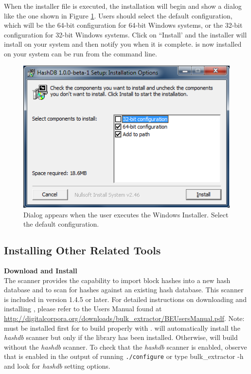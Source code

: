 \documentclass[11pt,fleqn]{article} %
\begin{document}
When the installer file is executed, the installation will begin and show a dialog like the one shown in Figure \ref{fig:windowsInstaller}.  Users should select the default configuration, which will be the 64-bit configuration for 64-bit Windows systems, or the 32-bit configuration for 32-bit Windows systems. Click on ``Install' and the installer will install \hash on your system and then notify you when it is complete. \hash is now installed on your system can be run from the command line.\\

\begin{figure}
	\center
	\includegraphics[scale=.8]{WindowsInstaller.png}
	\caption{Dialog appears when the user executes the Windows Installer. Select the default configuration.}
	\label{fig:windowsInstaller}
\end{figure}

\subsection{Installing Other Related Tools}

\textbf{Download and Install \bulk}\\
The \bulk \hash scanner provides the capability to import block hashes into a new hash database and to scan for hashes against an existing hash database.
This scanner is included in \bulk version 1.4.5 or later. For detailed instructions on downloading and installing \bulk, please refer to the Users Manual found at \url{http://digitalcorpora.org/downloads/bulk_extractor/BEUsersManual.pdf}. Note: \hash must be installed first for \bulk to build properly with \hash. \bulk will automatically install the \textit{hashdb} scanner but only if the \hash library has been installed. Otherwise, \bulk will build without the \textit{hashdb} scanner. To check that the \textit{hashdb} scanner is enabled, observe that is enabled in the output of running \texttt{./configure} or type {bulk\_extractor -h} and look for \textit{hashdb} setting options.\\
\end{document}
